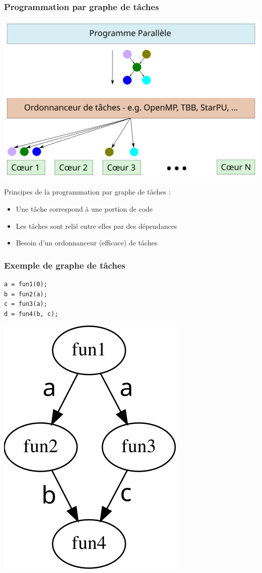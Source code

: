 \documentclass{beamer}
\begin{document}
\begin{frame}
  \frametitle{Programmation par graphe de tâches}

  \centerline{\includegraphics[width=0.8\linewidth]{runtime}}

  Principes de la programmation par graphe de tâches :
  \begin{itemize}
    \item Une tâche correspond à une portion de code
    \item Les tâches sont relié entre elles par des dépendances
    \item Besoin d'un ordonnanceur (efficace) de tâches
  \end{itemize}
\end{frame}


\begin{frame}[fragile]
  \frametitle{Exemple de graphe de tâches}


\begin{lstlisting}
a = fun1(0);
b = fun2(a);
c = fun3(a);
d = fun4(b, c);
\end{lstlisting}

  \centerline{\includegraphics[width=0.25\linewidth]{agg_exemple}}
\end{frame}
\end{document}
